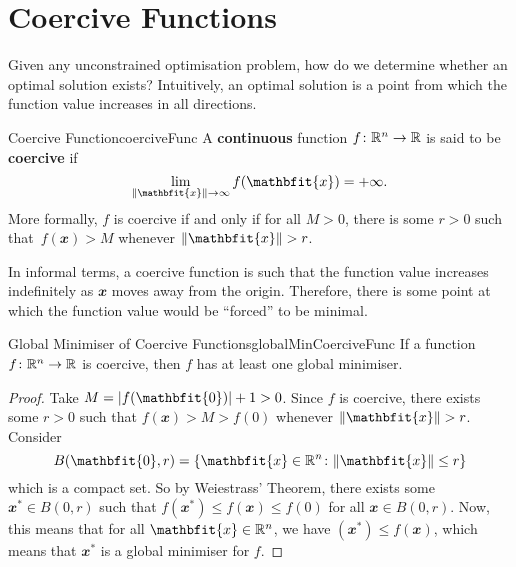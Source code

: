 \documentclass[math, code]{amznotes}
\theoremstyle{remark}
\begin{document}
\section{Coercive Functions}
Given any unconstrained optimisation problem, how do we determine whether an optimal solution exists? Intuitively, an optimal solution is a point from which the function value increases in all directions.
\begin{dfnbox}{Coercive Function}{coerciveFunc}
    A {\color{red} \textbf{continuous}} function $f \colon \mathbb{R}^n \to \mathbb{R}$ is said to be {\color{red} \textbf{coercive}} if
    \begin{equation*}
        \lim_{\norm{\mathbfit{x}} \to \infty} f(\mathbfit{x}) = +\infty.
    \end{equation*}
    More formally, $f$ is coercive if and only if for all $M > 0$, there is some $r > 0$ such that~$f(\mathbfit{x}) > M$ whenever $\norm{\mathbfit{x}} > r$.
\end{dfnbox}
In informal terms, a coercive function is such that the function value increases indefinitely as $\mathbfit{x}$ moves away from the origin. Therefore, there is some point at which the function value would be ``forced'' to be minimal.
\begin{thmbox}{Global Minimiser of Coercive Functions}{globalMinCoerciveFunc}
    If a function $f \colon \mathbb{R}^n \to \mathbb{R}$ is coercive, then $f$ has at least one global minimiser.
    \tcblower   
    \begin{proof}
        Take $M = \abs{f(\mathbfit{0})} + 1 > 0$. Since $f$ is coercive, there exists some $r > 0$ such that $f(\mathbfit{x}) > M > f(\mathbfit{0})$ whenever $\norm{\mathbfit{x}} > r$. Consider
        \begin{displaymath}
            B(\mathbfit{0}, r) = \left\{\mathbfit{x} \in \R^n \colon \norm{\mathbfit{x}} \leq r\right\}
        \end{displaymath}
        which is a compact set. So by Weiestrass' Theorem, there exists some $\mathbfit{x}^* \in B(\mathbfit{0}, r)$ such that $f(\mathbfit{x}^*) \leq f(\mathbfit{x}) \leq f(\mathbfit{0})$ for all $\mathbfit{x} \in B(\mathbfit{0}, r)$. Now, this means that for all $\mathbfit{x} \in \R^n$, we have $(\mathbfit{x}^*) \leq f(\mathbfit{x})$, which means that $\mathbfit{x}^*$ is a global minimiser for $f$.
    \end{proof}
\end{thmbox}
\end{document}

